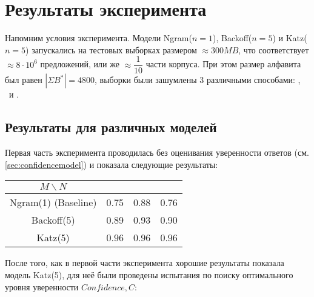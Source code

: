 \section{ Результаты эксперимента }\label{sec:results}

Напомним условия эксперимента. Модели Ngram($n = 1$), Backoff($n = 5$) и Katz($n = 5$) запускались на тестовых выборках размером $\approx 300 MB$, что соответствует $\approx 8 \cdot 10^6$ предложений, или же $\approx \dfrac{1}{10}$ части корпуса. При этом размер алфавита был равен $|\Sigma{B^*}| = 4800$, выборки были зашумлены 3 различными способами: \KG, \BS\ и \MX. 

\subsection{ Результаты для различных моделей }

Первая часть эксперимента проводилась без оценивания уверенности ответов (см. \cref{sec:confidencemodel}) и показала следующие результаты:

\vspace{20pt}

\begin{tabular}{|c|c|c|c|}\hline
	$M \backslash N$ & \KG & \BS & \MX \\ \hline
	Ngram(1) (Baseline) & 0.75 & 0.88 & 0.76 \\
	Backoff(5) & 0.89 & 0.93 & 0.90 \\
	Katz(5) & 0.96 & 0.96 & 0.96 \\ \hline 	
\end{tabular}

\vspace{20pt}


После того, как в первой части эксперимента хорошие результаты показала модель Katz(5), для неё были проведены испытания по поиску оптимального уровня уверенности $Confidence, C$:

\vspace{20pt}

